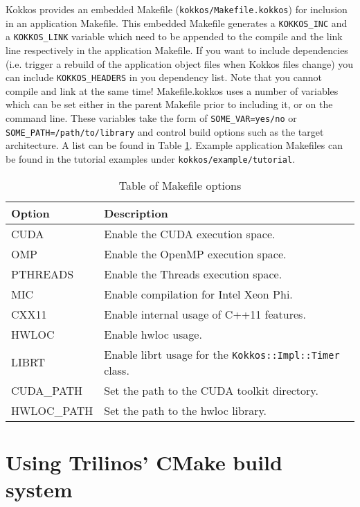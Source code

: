 Kokkos provides an embedded Makefile (\lstinline|kokkos/Makefile.kokkos|) for inclusion in an application Makefile. 
This embedded Makefile generates a \lstinline|KOKKOS_INC| and a \newline
\lstinline|KOKKOS_LINK| variable which need to be appended to the compile and the link line respectively in the application Makefile. 
If you want to include dependencies (i.e. trigger a rebuild of the application object files when Kokkos files change) you can include \lstinline|KOKKOS_HEADERS| in you dependency list.
Note that you cannot compile and link at the same time!
Makefile.kokkos uses a number of variables which can be set either in the parent Makefile prior to including it, or on the command line.
These variables take the form of \lstinline|SOME_VAR=yes/no| or \lstinline|SOME_PATH=/path/to/library| and control build options such as the target architecture. 
A list can be found in Table \ref{TBL:MakefileOptions}.
Example application Makefiles can be found in the tutorial examples under \verb!kokkos/example/tutorial!.


\begin{table}
\caption{Table of Makefile options}
\label{TBL:MakefileOptions}
\begin{small}
\begin{tabular}[t]{lp{}}
\hline\hline
Option & Description \\
\hline
CUDA & Enable the CUDA execution space. \\
OMP & Enable the OpenMP execution space. \\
PTHREADS & Enable the Threads execution space.\\
MIC & Enable compilation for Intel Xeon Phi. \\
CXX11 & Enable internal usage of C++11 features.\\
HWLOC & Enable hwloc usage.\\
LIBRT & Enable librt usage for the \lstinline|Kokkos::Impl::Timer| class.\\
CUDA\_PATH & Set the path to the CUDA toolkit directory.\\
HWLOC\_PATH & Set the path to the hwloc library.\\
\hline\hline
\end{tabular}
\end{small}
\end{table}

\section{Using Trilinos' CMake build system}\label{S:build:Trilinos}

